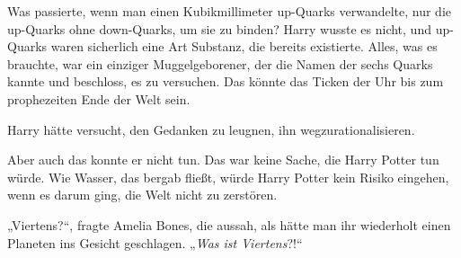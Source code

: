 Was passierte, wenn man einen Kubikmillimeter up-Quarks verwandelte, nur die up-Quarks ohne down-Quarks, um sie zu binden? Harry wusste es nicht, und up-Quarks waren sicherlich eine Art Substanz, die bereits existierte. Alles, was es brauchte, war ein einziger Muggelgeborener, der die Namen der sechs Quarks kannte und beschloss, es zu versuchen. Das könnte das Ticken der Uhr bis zum prophezeiten Ende der Welt sein.

Harry hätte versucht, den Gedanken zu leugnen, ihn wegzurationalisieren.

Aber auch das konnte er nicht tun. Das war keine Sache, die Harry Potter tun würde.
Wie Wasser, das bergab fließt, würde Harry Potter kein Risiko eingehen, wenn es darum ging, die Welt nicht zu zerstören.

„Viertens?“, fragte Amelia Bones, die aussah, als hätte man ihr wiederholt einen Planeten ins Gesicht geschlagen. „\emph{Was ist Viertens}?!“

